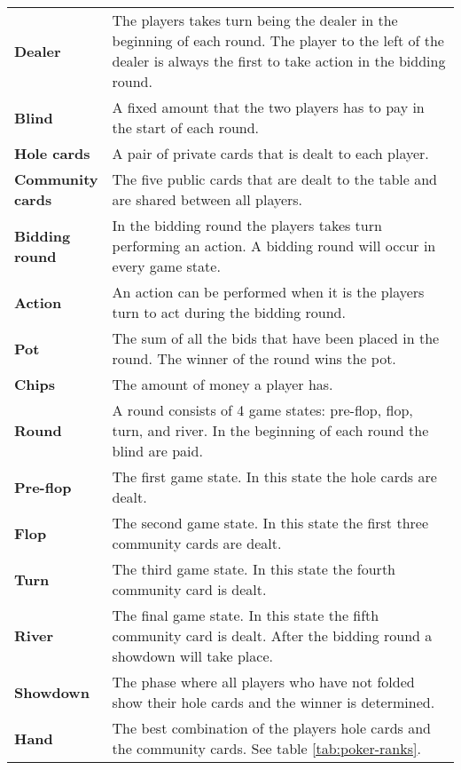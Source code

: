 \begin{tabular}{ p{0.18\linewidth} p{0.82\linewidth} }
\textbf{Dealer} & The players takes turn being the dealer in the beginning of each round. The player to the left of the dealer is always the first to take action in the bidding round.\\
\textbf{Blind} & A fixed amount that the two players has to pay in the start of each round.\\
\textbf{Hole cards} & A pair of private cards that is dealt to each player. \\
\textbf{Community cards} & The five public cards that are dealt to the table and are shared between all players.\\
\textbf{Bidding round} & In the bidding round the players takes turn performing an action. A bidding round will occur in every game state.\\
\textbf{Action} & An action can be performed when it is the players turn to act during the bidding round.\\
\textbf{Pot} & The sum of all the bids that have been placed in the round. The winner of the round wins the pot.\\
\textbf{Chips} & The amount of money a player has.\\
\textbf{Round} & A round consists of 4 game states: pre-flop, flop, turn, and river. In the beginning of each round the blind are paid.\\
\textbf{Pre-flop} & The first game state. In this state the hole cards are dealt.\\
\textbf{Flop} & The second game state. In this state the first three community cards are dealt.\\
\textbf{Turn} & The third game state. In this state the fourth community card is dealt.\\
\textbf{River} & The final game state. In this state the fifth community card is dealt. After the bidding round a showdown will take place.\\
\textbf{Showdown} & The phase where all players who have not folded show their hole cards and the winner is determined.\\
\textbf{Hand} & The best combination of the players hole cards and the community cards. See table \ref{tab:poker-ranks}.
\end{tabular}

